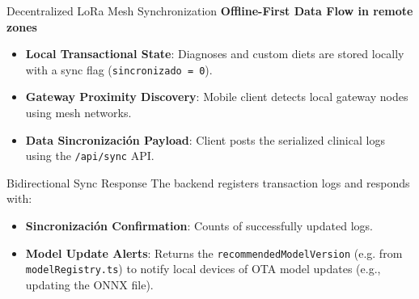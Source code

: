 \documentclass[aspectratio=169]{beamer}
\begin{document}
\begin{frame}{Decentralized LoRa Mesh Synchronization}
    \textbf{Offline-First Data Flow in remote zones}
    \begin{itemize}
        \item \textbf{Local Transactional State}: Diagnoses and custom diets are stored locally with a sync flag (\texttt{sincronizado = 0}).
        \item \textbf{Gateway Proximity Discovery}: Mobile client detects local gateway nodes using mesh networks.
        \item \textbf{Data Sincronización Payload}: Client posts the serialized clinical logs using the \texttt{/api/sync} API.
    \end{itemize}
    \begin{block}{Bidirectional Sync Response}
        The backend registers transaction logs and responds with:
        \begin{itemize}
            \item \textbf{Sincronización Confirmation}: Counts of successfully updated logs.
            \item \textbf{Model Update Alerts}: Returns the \texttt{recommendedModelVersion} (e.g. from \texttt{modelRegistry.ts}) to notify local devices of OTA model updates (e.g., updating the ONNX file).
        \end{itemize}
    \end{block}
\end{frame}
\end{document}
